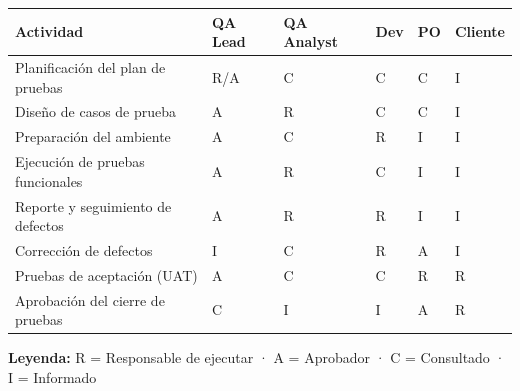 \documentclass[10pt,a4paper]{article}
\newcounter{none}
\begin{document}
{\def\LTcaptype{none} %
\begin{longtable}[]{@{}
  >{\raggedright\arraybackslash}p{}
  >{\raggedright\arraybackslash}p{}
  >{\raggedright\arraybackslash}p{}
  >{\raggedright\arraybackslash}p{}
  >{\raggedright\arraybackslash}p{}
  >{\raggedright\arraybackslash}p{}@{}}
\toprule\noalign{}
\begin{minipage}[b]{\linewidth}\raggedright
Actividad
\end{minipage} & \begin{minipage}[b]{\linewidth}\raggedright
QA Lead
\end{minipage} & \begin{minipage}[b]{\linewidth}\raggedright
QA Analyst
\end{minipage} & \begin{minipage}[b]{\linewidth}\raggedright
Dev
\end{minipage} & \begin{minipage}[b]{\linewidth}\raggedright
PO
\end{minipage} & \begin{minipage}[b]{\linewidth}\raggedright
Cliente
\end{minipage} \\
\midrule\noalign{}
\endhead
\bottomrule\noalign{}
\endlastfoot
Planificación del plan de pruebas & R/A & C & C & C & I \\
Diseño de casos de prueba & A & R & C & C & I \\
Preparación del ambiente & A & C & R & I & I \\
Ejecución de pruebas funcionales & A & R & C & I & I \\
Reporte y seguimiento de defectos & A & R & R & I & I \\
Corrección de defectos & I & C & R & A & I \\
Pruebas de aceptación (UAT) & A & C & C & R & R \\
Aprobación del cierre de pruebas & C & I & I & A & R \\
\end{longtable}
}

\endgroup\medskip

\textbf{Leyenda:} R = Responsable de ejecutar · A = Aprobador · C = Consultado · I = Informado
\end{document}
